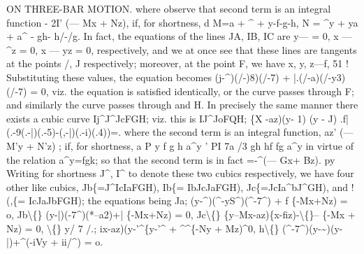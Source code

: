 \documentclass[12pt,a4paper]{article}
\begin{document}
ON THREE-BAR MOTION.
where observe that second term
is an
integral function - 2I' (--- Mx + Nz),
if,
for shortness,
d
M=a + \textasciicircum{} + y-f-g-h,
N = \textasciicircum{}y + ya + a\textasciicircum{} - gh- h/-/g.
In
fact,
the
equations
of
the
lines JA,
IB, IC
are y--- = 0, x --- \textasciicircum{}z = 0, x --- yz = 0,
respectively,
and we
at
once
see
that
these
lines
are
tangents
at
the
points
/, J
respectively;
moreover,
at
the
point
F, we
have
x,
y, z---f, 51
!\textbullet{}
Substituting
these
values, the equation becomes
(j-\textasciicircum{})(/-)8)(/-7) + |.(/-a)(/-y3)(/-7) = 0,
viz.
the
equation
is
satisfied
identically,
or the
curve
passes
through F; and
similarly
the
curve
passes through
and H.
In
precisely
the same manner
there
exists a cubic curve Ij\textasciicircum{}J\textasciicircum{}JcFGH;
viz.
this
is
IJ\textasciicircum{}JoFQH;
\{X -az)(y- 1) (y -
J)
.f|(.-9(.-|)(.-5)-(,-|)(.-i)(.4))=\guillemotright{}.
where the second term
is an integral
function,
az' (--- M'y + N'z)
;
if,
for shortness,
a
P
y
f
g
h
a\textasciicircum{}y
'
PI
7a
\guillemotleft{}/3
gh
hf
fg
a\textasciicircum{}y
in virtue of the
relation a\textasciicircum{}y=fgk;
so that the second term
is in
fact =-\textasciicircum{}(--- Gx+ Bz).
py
Writing
for
shortness
J\textasciicircum{},
I\textasciicircum{}
to
denote
these
two
cubics
respectively,
we
have
four
other
like
cubics, Jb\{=J\textasciicircum{}IcIaFGH), Ib\{= IbJcJaFGH), Jc\{=JcIa\textasciicircum{}bJ\textasciicircum{}GH), and
!(,\{= IcJaJbFGH);
the equations being
Ja;
(y-\textasciicircum{})(\textasciicircum{}-yS\textasciicircum{})(\textasciicircum{}-7\textasciicircum{}) + f \{-Mx+Nz) = o,
Jb\textbackslash\{\}
(y-|)(\guillemotleft{}-7\textasciicircum{})(*--a2)+| \{-Mx+Nz) = 0,
Jc\textbackslash\{\}
\{y--Mx-az)\{x-fiz)-\textbackslash\{\}-- \{-Mx + Nz) = 0,
\textbackslash\{\}
y/
7
/.;
ix-az)(y-'\textasciicircum{}\{y-'\textasciicircum{} + \textasciicircum{}\textasciicircum{}\{-Ny + Mz)\textasciicircum{}0,
h\textbackslash\{\}
(\textasciicircum{}-7\textasciicircum{})(y-\textasciitilde{})(y-|)+\textasciicircum{}(-iVy + ii/\textasciicircum{}) = o.
\end{document}

